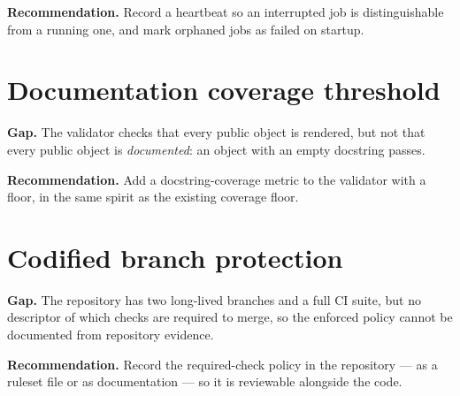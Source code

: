 \textbf{Recommendation.} Record a heartbeat so an interrupted job is
distinguishable from a running one, and mark orphaned jobs as failed on
startup.

\section{Documentation coverage threshold}

\textbf{Gap.} The validator checks that every public object is rendered, but
not that every public object is \emph{documented}: an object with an empty
docstring passes.

\textbf{Recommendation.} Add a docstring-coverage metric to the validator with
a floor, in the same spirit as the existing coverage floor.

\section{Codified branch protection}

\textbf{Gap.} The repository has two long-lived branches and a full CI suite,
but no descriptor of which checks are required to merge, so the enforced policy
cannot be documented from repository evidence.

\textbf{Recommendation.} Record the required-check policy in the repository ---
as a ruleset file or as documentation --- so it is reviewable alongside the
code.
